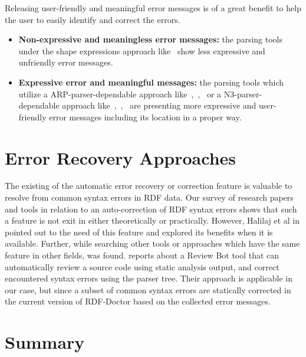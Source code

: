 Releasing user-friendly and meaningful error messages is of a great benefit to help the user to easily identify and correct the errors. 
\begin{itemize}
    \item \textbf{Non-expressive and meaningless error messages:} the parsing tools under the shape expressions approach like~\cite{prud2014shape} show less expressive and unfriendly error messages.
    \item \textbf{Expressive error and meaningful messages:} the parsing tools which utilize a ARP-parser-dependable approach like~\cite{N3Parser:Online},~\cite{Mybluemix:Validation:Online},~\cite{McBride:2002:JSW:613357.613755} or a N3-parser-dependable approach like~\cite{N3Parser:Online},~\cite{IDLab:Validation:Online},~\cite{petersenturtleeditor} are presenting more expressive and user-friendly error messages including its location in a proper way. 
    
\end{itemize}

\section{Error Recovery Approaches}
The existing of the automatic error recovery or correction feature is valuable to resolve from common syntax errors in RDF data.  Our survey of research papers and tools in relation to an auto-correction of RDF syntax errors shows that such a feature is not exit in either theoretically or practically. %
However, Halilaj et al in \cite{Git4Voc:article} pointed out to the need of this feature and explored its benefits when it is available.
Further, while searching other tools or approaches which have the same feature in other fields, \cite{AutoCorrection:Fix-it} was found.  \cite{AutoCorrection:Fix-it} reports about a Review Bot tool that can automatically review a source code using static analysis output, and correct encountered syntax errors using the parser tree. Their approach is applicable in our case, but since a subset of common syntax errors are statically corrected in the current version of RDF-Doctor based on the collected error messages.    

\section{Summary}

